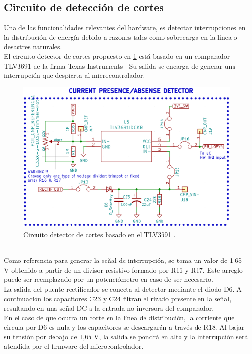  \subsection{Circuito de detección de cortes}
 Una de las funcionalidades relevantes del hardware, es detectar interrupciones en la distribución de energía debido a razones tales como sobrecarga en la línea o desastres naturales.\\
 El circuito detector de cortes propuesto en \ref{fig:ctodetectorcortes} está basado en un comparador TLV3691 de la firma Texas Instruments \citep{tlv3691}. Su salida se encarga de generar una interrupción que despierta al microcontrolador.\\
 \begin{figure}[h]
 	\centering
 	\includegraphics[width=0.9\linewidth]{Figures/cto_detector_cortes}
 	\caption{Circuito detector de cortes basado en el TLV3691 \citep{tlv3691}.}
 	\label{fig:ctodetectorcortes}
 \end{figure}\\
 Como referencia para generar la señal de interrupción, se toma un valor de 1,65 V obtenido a partir de un divisor resistivo formado por R16 y R17. Este arreglo puede ser reemplazado por un potenciómetro en caso de ser necesario.\\
 La salida del puente rectificador se conecta al detector mediante el diodo D6. A continuación los capacitores C23 y C24 filtran el rizado presente en la señal, resultando en una señal DC a la entrada no inversora del comparador.\\
 En el caso de que ocurra un corte en la línea de distribución, la corriente que circula por D6 es nula y los capacitores se descargar\'{a}n a través de R18. Al bajar su tensión por debajo de 1,65 V, la salida se pondrá en alto y la interrupción será atendida por el firmware del microcontrolador.\\
 
